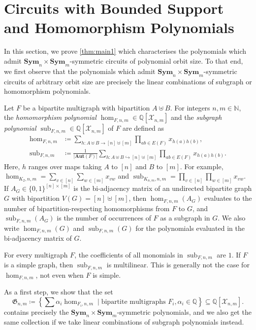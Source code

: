 \documentclass[11pt, DIV=15]{scrarticle}
\theoremstyle{definition}
\theoremstyle{plain}
\theoremstyle{remark}
\DeclareMathOperator{\sub}{sub}
\newcommand{\Aut}{\mathbf{Aut}}
\newcommand{\Sym}{\mathbf{Sym}}
\begin{document}
	
	

	
	
	\section{Circuits with Bounded Support and Homomorphism Polynomials}
	\label{sec:circuitsAndHomPolynomials}
	In this section, we prove \cref{thm:main1} which characterises the polynomials which admit $\Sym_n \times \Sym_m$-symmetric circuits of polynomial orbit size.
	To that end, we first observe that  the polynomials which admit $\Sym_n \times \Sym_m$-symmetric circuits of arbitrary orbit size are precisely the linear combinations of subgraph or homomorphism polynomials.
	
	Let $F$ be a bipartite multigraph with bipartition $A \uplus B$.
	For integers $n,m \in \mathbb{N}$,
	the \emph{homomorphism polynomial $\hom_{F, n,m} \in \mathbb{Q}[\mathcal{X}_{n,m}]$} and the \emph{subgraph polynomial $\sub_{F, n,m} \in \mathbb{Q}[\mathcal{X}_{n,m}]$} of $F$ are defined as
	\begin{align*}
		\hom_{F, n, m} &\coloneqq \sum_{h \colon A \uplus B \to [n] \uplus [m]} \prod_{ab \in E(F)} x_{h(a)h(b)}, \\
		\sub_{F, n, m} &\coloneqq \frac{1}{|\Aut(F)|}\sum_{h \colon A \uplus B \hookrightarrow [n] \uplus [m]} \prod_{ab \in E(F)} x_{h(a)h(b)}.
	\end{align*}
	Here, $h$ ranges over maps taking $A$ to $[n]$ and $B$ to $[m]$.
	For example, $\hom_{K_2, n, m} = \sum_{v \in [n]} \sum_{w \in [m]} x_{vw}$ and $\sub_{K_{n,m}, n,m} = \prod_{v\in [n]} \prod_{w \in [m]} x_{vw}$. 
	If $A_G \in \{0,1\}^{[n] \times [m]}$ is the bi-adjacency matrix of an undirected bipartite graph $G$ with bipartition $V(G) = [n] \uplus [m]$, then $\hom_{F,n,m}(A_G)$ evaluates to the number of bipartition-respecting homomorphisms from $F$ to $G$, and $\sub_{F, n,m}(A_G)$ is the number of occurrences of $F$ as a subgraph in $G$. We also write $\hom_{F,n,m}(G)$ and $\sub_{F, n,m}(G)$ for the polynomials evaluated in the bi-adjacency matrix of $G$.
	
	For every multigraph $F$, the coefficients of all monomials in $\sub_{F,n,m}$ are $1$. If $F$ is a simple graph, then $\sub_{F,n,m}$ is multilinear. 
	This is generally not the case for $\hom_{F, n,m}$, not even when $F$ is simple.
	
	As a first step, we show that the set
	\[
		\mathfrak{G}_{n,m} \coloneqq \left\{\sum \alpha_i \hom_{F_i, n,m} \mid \text{bipartite multigraphs } F_i, \alpha_i \in \mathbb{Q} \right\} \subseteq \mathbb{Q}[\mathcal{X}_{n,m}].
	\]
	contains precisely the $\Sym_n \times \Sym_m$-symmetric
        polynomials, and we also get the same collection if we take linear
        combinations of subgraph polynomials instead.
	
\end{document}

